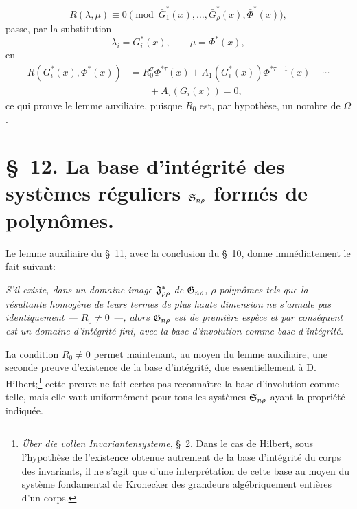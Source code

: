 \[
  R(\lambda,
\mu)\equiv 0\pmod{\bar G_1^*(x),\ldots,
\bar G_\rho^*(x),\bar\Phi^*(x)},
\]
passe, par la substitution
\[
  \lambda_i=G_i^*(x),\qquad \mu=\Phi^*(x),
\]
en
\begin{equation}
\begin{aligned}
  R(G_i^*(x),\Phi^*(x))
  &=R_0^\sigma\Phi^{*\tau}(x)
    +A_1(G_i^*(x))\Phi^{*\tau-1}(x)+\cdots \\
  &\qquad +A_\tau(G_i(x))=0,
\end{aligned}
\tag{6}
\end{equation}
ce qui prouve le lemme auxiliaire, puisque $R_0$ est, par hypothèse, un nombre de $\Omega$.

\section*{\S\ 12. La base d'intégrité des systèmes réguliers $\mathfrak{S}_{n\rho}$ formés de polynômes.}

Le lemme auxiliaire du \S\ 11, avec la conclusion du \S\ 10, donne immédiatement le fait suivant:

\emph{S'il existe, dans un domaine image $\mathfrak{J}^*_{\rho\rho}$ de $\mathfrak{G}_{n\rho}$, $\rho$ polynômes tels que la résultante homogène de leurs termes de plus haute dimension ne s'annule pas identiquement --- $R_0\ne0$ ---, alors $\mathfrak{G}_{n\rho}$ est de première espèce et par conséquent est un domaine d’intégrité fini, avec la base d'involution comme base d'intégrité.}

La condition $R_0\ne0$ permet maintenant, au moyen du lemme auxiliaire, une seconde preuve d'existence de la base d'intégrité, due essentiellement à D. Hilbert;\footnote{\emph{Über die vollen Invariantensysteme}, \S\ 2. Dans le cas de Hilbert, sous l'hypothèse de l'existence obtenue autrement de la base d'intégrité du corps des invariants, il ne s'agit que d'une interprétation de cette base au moyen du système fondamental de Kronecker des grandeurs algébriquement entières d'un corps.} cette preuve ne fait certes pas reconnaître la base d'involution comme telle, mais elle vaut uniformément pour tous les systèmes $\mathfrak{S}_{n\rho}$ ayant la propriété indiquée.

